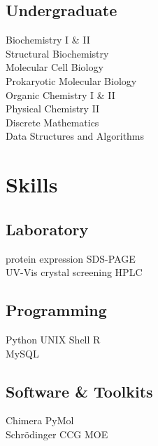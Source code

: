 \documentclass[]{deedy-resume-openfont}
\begin{document}
\begin{minipage}[t]{0.33\textwidth}
\subsection{Undergraduate}
Biochemistry I \& II \\
Structural Biochemistry\\
Molecular Cell Biology \\
Prokaryotic Molecular Biology \\
Organic Chemistry I \& II \\
Physical Chemistry II \\
Discrete Mathematics \\
Data Structures and Algorithms\\
\sectionsep


\section{Skills}

\subsection{Laboratory}
 \textbullet{} protein expression
 \textbullet{} SDS-PAGE\\
 \textbullet{} UV-Vis
 \textbullet{} crystal screening
 \textbullet{} HPLC\\
\sectionsep

\subsection{Programming}
 \textbullet{} Python
 \textbullet{} UNIX Shell
 \textbullet{} R \\
 \textbullet{} MySQL
\sectionsep

\subsection{Software \& Toolkits}
 \textbullet{} Chimera
 \textbullet{} PyMol\\
 \textbullet{} Schrödinger
 \textbullet{} CCG MOE
 \\
\sectionsep


\end{minipage}
\end{document}
